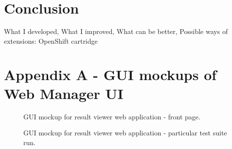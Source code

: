 \documentclass[11pt,oneside,final]{fithesis2}
\begin{document}
\label{sec:plannedExtensions}
  
\chapter{Conclusion}
What I developed, What I improved, What can be better, Possible ways of extensions: OpenShift cartridge

\appendix
\chapter{Appendix A - GUI mockups of Web Manager UI}
\label{appendeix:a}

\begin{figure}[!htb]
    \begin{center}
    \leavevmode
    \centerline{}
    \end{center}
    \caption{GUI mockup for result viewer web application - front page.}
    \label{fig:frontPageMock}
\end{figure}

\begin{figure}[!htb]
    \begin{center}
    \leavevmode
    \centerline{}
    \end{center}
    \caption{GUI mockup for result viewer web application - particular test suite run.}
    \label{fig:particularRunMock}
\end{figure}
\end{document}
